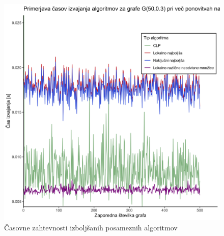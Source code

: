 \documentclass[a4paper, 12pt]{article}
\begin{document}
\begin{figure}[h!]
	\begin{center}
		\includegraphics[scale=0.11]{R_koda/pon-casi-maxi.png}
		\caption{Časovne zahtevnosti izboljšanih posameznih algoritmov}
	\end{center}
\end{figure}
\end{document}
